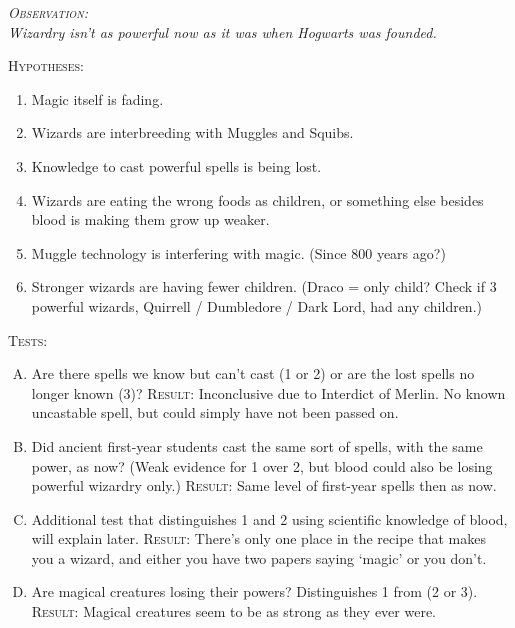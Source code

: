 \begin{center}
\itshape
{\scshape Observation:}\\
Wizardry isn't as powerful now as it was when Hogwarts was founded.

\vspace{.5\baselineskip plus 1\baselineskip minus .5\baselineskip}%

\begin{samepage}
{\scshape Hypotheses:}
\begin{enumerate}[1.]
    \firmlist
    \item Magic itself is fading.
    \item Wizards are interbreeding with Muggles and Squibs.
    \item Knowledge to cast powerful spells is being lost.
    \item Wizards are eating the wrong foods as children, or something else besides blood is making them grow up weaker.
    \item Muggle technology is interfering with magic. (Since 800 years ago?)
    \item Stronger wizards are having fewer children. (Draco = only child? Check if 3 powerful wizards, Quirrell / Dumbledore / Dark Lord, had any children.)
\end{enumerate}
\end{samepage}

{\scshape Tests:}
\begin{enumerate}[A.]
    \firmlist
    \item Are there spells we know but can't cast (1 or 2) or are the lost spells no longer known (3)? {\scshape Result:} Inconclusive due to Interdict of Merlin. No known uncastable spell, but could simply have not been passed on.
    \item Did ancient first-year students cast the same sort of spells, with the same power, as now? (Weak evidence for 1 over 2, but blood could also be losing powerful wizardry only.) {\scshape Result:} Same level of first-year spells then as now.
    \item Additional test that distinguishes 1 and 2 using scientific knowledge of blood, will explain later. {\scshape Result:} There's only one place in the recipe that makes you a wizard, and either you have two papers saying `magic' or you don't.
    \item Are magical creatures losing their powers? Distinguishes 1 from (2 or 3). {\scshape Result:} Magical creatures seem to be as strong as they ever were.
\end{enumerate}
\end{center}

